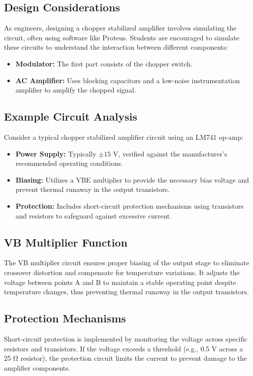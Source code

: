\subsection{Design Considerations}
As engineers, designing a chopper stabilized amplifier involves simulating the circuit, often using software like Proteus. Students are encouraged to simulate these circuits to understand the interaction between different components:

\begin{itemize}
    \item \textbf{Modulator:} The first part consists of the chopper switch.
    \item \textbf{AC Amplifier:} Uses blocking capacitors and a low-noise instrumentation amplifier to amplify the chopped signal.
\end{itemize}

\subsection{Example Circuit Analysis}
Consider a typical chopper stabilized amplifier circuit using an LM741 op-amp:

\begin{itemize}
    \item \textbf{Power Supply:} Typically $\pm15$ V, verified against the manufacturer's recommended operating conditions.
    \item \textbf{Biasing:} Utilizes a VBE multiplier to provide the necessary bias voltage and prevent thermal runaway in the output transistors.
    \item \textbf{Protection:} Includes short-circuit protection mechanisms using transistors and resistors to safeguard against excessive current.
\end{itemize}

\subsection{VB Multiplier Function}
The VB multiplier circuit ensures proper biasing of the output stage to eliminate crossover distortion and compensate for temperature variations. It adjusts the voltage between points A and B to maintain a stable operating point despite temperature changes, thus preventing thermal runaway in the output transistors.

\subsection{Protection Mechanisms}
Short-circuit protection is implemented by monitoring the voltage across specific resistors and transistors. If the voltage exceeds a threshold (e.g., 0.5 V across a 25 Ω resistor), the protection circuit limits the current to prevent damage to the amplifier components.

